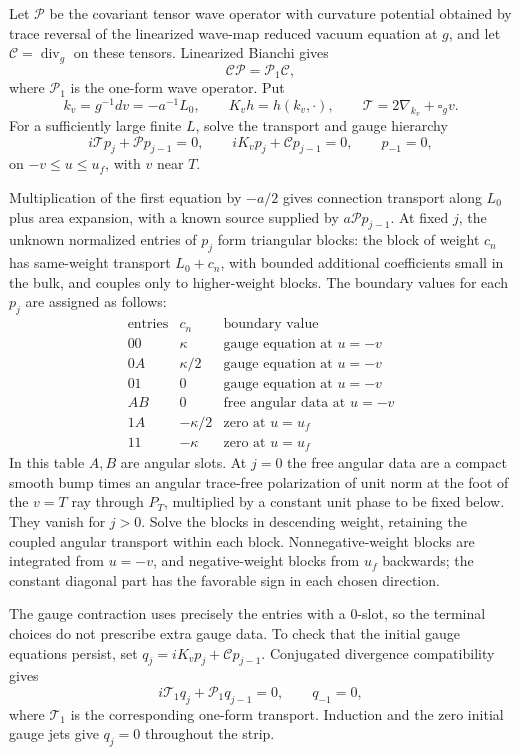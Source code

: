Let $\mathcal P$ be the covariant tensor wave operator with curvature
potential obtained by trace reversal of the linearized wave-map reduced
vacuum equation at $g$, and let $\mathcal C=\operatorname{div}_g$ on
these tensors. Linearized Bianchi gives
\[
 \mathcal C\mathcal P=\mathcal P_1\mathcal C,
\]
where $\mathcal P_1$ is the one-form wave operator. Put
\[
 k_v=g^{-1}dv=-a^{-1}L_0,
 \qquad K_vh=h(k_v,\cdot),
 \qquad \mathcal T=2\nabla_{k_v}+\square_gv.
\]
For a sufficiently large finite $L$, solve the transport and gauge
hierarchy
\begin{equation}
 i\mathcal Tp_j+\mathcal Pp_{j-1}=0,
 \qquad iK_vp_j+\mathcal Cp_{j-1}=0,
 \qquad p_{-1}=0,
 \label{pk2:hierarchy}
\end{equation}
on $-v\le u\le u_f$, with $v$ near $T$.

Multiplication of the first equation by $-a/2$ gives connection
transport along $L_0$ plus area expansion, with a known source
supplied by $a\mathcal Pp_{j-1}$. At fixed $j$, the unknown normalized
entries of $p_j$ form triangular blocks: the block of weight $c_n$
has same-weight transport $L_0+c_n$, with bounded additional
coefficients small in the bulk, and couples only to higher-weight
blocks. The boundary values for each $p_j$ are assigned as follows:
\[
\begin{array}{c|c|l}
\text{entries}&c_n&\text{boundary value}\\ \hline
00&\kappa&\text{gauge equation at }u=-v\\
0A&\kappa/2&\text{gauge equation at }u=-v\\
01&0&\text{gauge equation at }u=-v\\
AB&0&\text{free angular data at }u=-v\\
1A&-\kappa/2&\text{zero at }u=u_f\\
11&-\kappa&\text{zero at }u=u_f
\end{array}
\]
In this table $A,B$ are angular slots. At $j=0$ the free angular
data are a compact smooth bump times an angular trace-free
polarization of unit norm at the foot of the $v=T$ ray through
$P_T$, multiplied by a constant unit phase to be fixed below.
They vanish for $j>0$. Solve the blocks in descending weight,
retaining the coupled angular transport within each block.
Nonnegative-weight blocks are integrated from $u=-v$, and
negative-weight blocks from $u_f$ backwards; the constant diagonal
part has the favorable sign in each chosen direction.

The gauge contraction uses precisely the entries with a $0$-slot,
so the terminal choices do not prescribe extra gauge data. To check
that the initial gauge equations persist, set
$q_j=iK_vp_j+\mathcal Cp_{j-1}$. Conjugated divergence compatibility
gives
\[
 i\mathcal T_1q_j+\mathcal P_1q_{j-1}=0,\qquad q_{-1}=0,
\]
where $\mathcal T_1$ is the corresponding one-form transport. Induction
and the zero initial gauge jets give $q_j=0$ throughout the strip.

